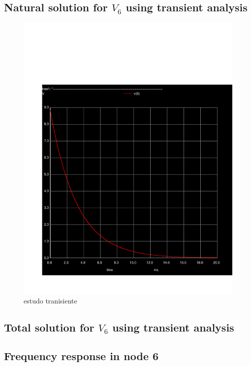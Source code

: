 \pagebreak
\subsection{ Natural solution for $V_6$ using transient analysis}
\begin{figure}[h] \centering
\includegraphics[width=0.6\linewidth]{trans.pdf}
\caption{estudo tranisiente}
\label{fig:transient}
\end{figure}

\pagebreak
\subsection{ Total solution for $V_6$ using transient analysis}

\pagebreak
\subsection{ Frequency response in node 6}

